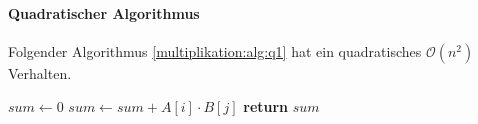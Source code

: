 \paragraph{Quadratischer Algorithmus}

Folgender Algorithmus \ref{multiplikation:alg:q1} hat ein quadratisches $\mathcal{O}(n^2)$ Verhalten.

\begin{algorithm}[H]\caption{}
	\label{multiplikation:alg:q1}
	\setlength{\lineskip}{7pt}
	\begin{algorithmic}
		\State $ sum \gets 0$
		\State $ sum \gets sum + A[i] \cdot B[j] $
		\EndFor
		\EndFor
		\State \textbf{return} $sum$
		\EndFunction
	\end{algorithmic}
\end{algorithm}



